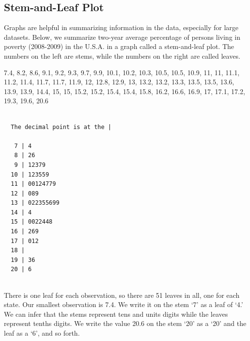 \documentclass[11pt, chapterprefix=true]{scrbook}\usepackage[]{graphicx}\usepackage[]{color}
\begin{document}
\subsection{Stem-and-Leaf Plot}




Graphs are helpful in summarizing information in the data, especially for large datasets.  Below, we summarize two-year average percentage of persons living in poverty (2008-2009) in the U.S.A. in a graph called a stem-and-leaf plot.  The numbers on the left are stems, while the numbers on the right are called leaves.

\newpage

\begin{minipage}[ht]{7cm}

{\small{


7.4, 8.2, 8.6, 9.1, 9.2, 9.3, 9.7, 9.9, 10.1, 10.2, 10.3, 10.5, 10.5, 10.9, 11, 11, 11.1, 11.2, 11.4, 11.7, 11.7, 11.9, 12, 12.8, 12.9, 13, 13.2, 13.2, 13.3, 13.5, 13.5, 13.6, 13.9, 13.9, 14.4, 15, 15, 15.2, 15.2, 15.4, 15.4, 15.8, 16.2, 16.6, 16.9, 17, 17.1, 17.2, 19.3, 19.6, 20.6
}}
\end{minipage} %
\begin{minipage}[ht]{7cm}

{\small{
\begin{verbatim}

  The decimal point is at the |

   7 | 4
   8 | 26
   9 | 12379
  10 | 123559
  11 | 00124779
  12 | 089
  13 | 022355699
  14 | 4
  15 | 0022448
  16 | 269
  17 | 012
  18 | 
  19 | 36
  20 | 6


\end{verbatim}
}}
\end{minipage}

There is one leaf for each observation, so there are 51 leaves in all, one for each state.  Our smallest observation is 7.4.  We write it on the stem `7' as a leaf of `4.'  We can infer that the stems represent tens and units digits while the leaves represent tenths digits.  We write the value 20.6 on the stem `20' as a `20' and the leaf as a `6', and so forth.  \citep{sullivan2013}
\end{document}
